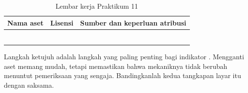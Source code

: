 \begin{table}[htbp]
\centering
\caption{Lembar kerja Praktikum 11}
\label{tab:lembar-praktikum-11}
{\setlength{\tabcolsep}{4pt}\footnotesize%
\begin{tabularx}{\textwidth}{@{}L{4.2cm} C{2.2cm} Y@{}}
\toprule
\headrow \textbf{Nama aset} & \textbf{Lisensi} & \textbf{Sumber dan keperluan atribusi} \\
\midrule
& & \\[1.6em]
\midrule
& & \\[1.6em]
\midrule
& & \\[1.6em]
\midrule
\addlinespace
{} \\[1.4em]
\addlinespace
{} \\[1.4em]
\addlinespace
{} \\[1.8em]
\bottomrule
\end{tabularx}}
\end{table}

\begin{catatabox}
Langkah ketujuh adalah langkah yang paling penting bagi indikator .
Mengganti aset memang mudah, tetapi memastikan bahwa mekaniknya tidak berubah
menuntut pemeriksaan yang sengaja. Bandingkanlah kedua tangkapan layar itu
dengan saksama.
\end{catatabox}
